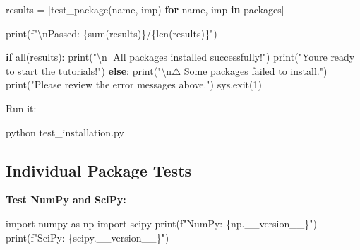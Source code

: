 \documentclass[
  11pt,
  letterpaper,
  oneside,
  openany]{book}
\newenvironment{Shaded}{\begin{snugshade}}{\end{snugshade}}
\newcommand{\BuiltInTok}[1]{\textcolor[rgb]{0.00,0.23,0.31}{#1}}
\newcommand{\CharTok}[1]{\textcolor[rgb]{0.13,0.47,0.30}{#1}}
\newcommand{\ControlFlowTok}[1]{\textcolor[rgb]{0.00,0.23,0.31}{\textbf{#1}}}
\newcommand{\DecValTok}[1]{\textcolor[rgb]{0.68,0.00,0.00}{#1}}
\newcommand{\ExtensionTok}[1]{\textcolor[rgb]{0.00,0.23,0.31}{#1}}
\newcommand{\ImportTok}[1]{\textcolor[rgb]{0.00,0.46,0.62}{#1}}
\newcommand{\KeywordTok}[1]{\textcolor[rgb]{0.00,0.23,0.31}{\textbf{#1}}}
\newcommand{\NormalTok}[1]{\textcolor[rgb]{0.00,0.23,0.31}{#1}}
\newcommand{\OperatorTok}[1]{\textcolor[rgb]{0.37,0.37,0.37}{#1}}
\newcommand{\SpecialCharTok}[1]{\textcolor[rgb]{0.37,0.37,0.37}{#1}}
\newcommand{\SpecialStringTok}[1]{\textcolor[rgb]{0.13,0.47,0.30}{#1}}
\newcommand{\StringTok}[1]{\textcolor[rgb]{0.13,0.47,0.30}{#1}}
\begin{document}
\begin{Shaded}
\begin{Highlighting}[]
\NormalTok{results }\OperatorTok{=}\NormalTok{ [test\_package(name, imp) }\ControlFlowTok{for}\NormalTok{ name, imp }\KeywordTok{in}\NormalTok{ packages]}

\BuiltInTok{print}\NormalTok{(}\SpecialStringTok{f"}\CharTok{\textbackslash{}n}\SpecialStringTok{Passed: }\SpecialCharTok{\{}\BuiltInTok{sum}\NormalTok{(results)}\SpecialCharTok{\}}\SpecialStringTok{/}\SpecialCharTok{\{}\BuiltInTok{len}\NormalTok{(results)}\SpecialCharTok{\}}\SpecialStringTok{"}\NormalTok{)}

\ControlFlowTok{if} \BuiltInTok{all}\NormalTok{(results):}
    \BuiltInTok{print}\NormalTok{(}\StringTok{"}\CharTok{\textbackslash{}n}\StringTok{🎉 All packages installed successfully!"}\NormalTok{)}
    \BuiltInTok{print}\NormalTok{(}\StringTok{"You\textquotesingle{}re ready to start the tutorials!"}\NormalTok{)}
\ControlFlowTok{else}\NormalTok{:}
    \BuiltInTok{print}\NormalTok{(}\StringTok{"}\CharTok{\textbackslash{}n}\StringTok{⚠️  Some packages failed to install."}\NormalTok{)}
    \BuiltInTok{print}\NormalTok{(}\StringTok{"Please review the error messages above."}\NormalTok{)}
\NormalTok{    sys.exit(}\DecValTok{1}\NormalTok{)}
\end{Highlighting}
\end{Shaded}

Run it:

\begin{Shaded}
\begin{Highlighting}[]
\ExtensionTok{python}\NormalTok{ test\_installation.py}
\end{Highlighting}
\end{Shaded}

\subsection*{Individual Package Tests}\label{individual-package-tests}

\textbf{Test NumPy and SciPy:}

\begin{Shaded}
\begin{Highlighting}[]
\ImportTok{import}\NormalTok{ numpy }\ImportTok{as}\NormalTok{ np}
\ImportTok{import}\NormalTok{ scipy}
\BuiltInTok{print}\NormalTok{(}\SpecialStringTok{f"NumPy: }\SpecialCharTok{\{}\NormalTok{np}\SpecialCharTok{.}\NormalTok{\_\_version\_\_}\SpecialCharTok{\}}\SpecialStringTok{"}\NormalTok{)}
\BuiltInTok{print}\NormalTok{(}\SpecialStringTok{f"SciPy: }\SpecialCharTok{\{}\NormalTok{scipy}\SpecialCharTok{.}\NormalTok{\_\_version\_\_}\SpecialCharTok{\}}\SpecialStringTok{"}\NormalTok{)}
\end{Highlighting}
\end{Shaded}
\end{document}
